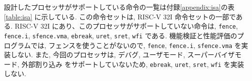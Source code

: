 \documentclass[../specifications.tex]{subfiles}
\begin{document}
  設計したプロセッサがサポートしている命令の一覧は付録\ref{appendix:isa}の表\ref{table:isa} に示している.
  この命令セットは, RISC-V 32I 命令セットの一部である.
  RISC-V 32I にあり、このプロセッサがサポートしていない命令は, 
  \verb|fence|, \verb|fence.i|, \verb|sfence.vma|, \verb|ebreak|, 
  \verb|uret|, \verb|sret|, \verb|wfi| である.
  機能検証と性能評価のプログラムでは, フェンスを使うことがないので, 
  \verb|fence|, \verb|fence.i|, \verb|sfence.vma| を実装しない.
  また, 今回のプロセッサは, デバグ, ユーザモード, スーパーバイザモード, 外部割り込み
  をサポートしていないため, \verb|ebreak|, \verb|uret|, 
  \verb|sret|, \verb|wfi| を実装しない.
  
\end{document}

